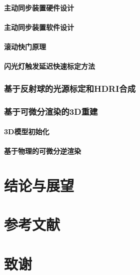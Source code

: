 \documentclass{ctexart}
\begin{document}
\paragraph{主动同步装置硬件设计}

\paragraph{主动同步装置软件设计}

\paragraph{滚动快门原理}

\paragraph{闪光灯触发延迟快速标定方法}

\subsubsection{基于反射球的光源标定和HDRI合成}

\subsubsection{基于可微分渲染的3D重建}

\paragraph{3D模型初始化}

\paragraph{基于物理的可微分逆渲染}

\section{结论与展望}

\section*{参考文献}

\section*{致谢}
\end{document}
